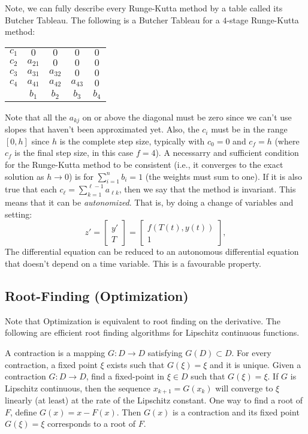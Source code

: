 \documentclass[12pt]{article}
\begin{document}
Note, we can fully describe every Runge-Kutta method by a table
called its Butcher Tableau.
The following is a Butcher Tableau for a $4$-stage Runge-Kutta method:
\begin{center}
\begin{tabular}{c|cccc}
$c_1$ & $0$ & $0$ & $0$ & $0$ \\
$c_2$ & $a_{21}$ & $0$ & $0$ & $0$ \\
$c_3$ & $a_{31}$ & $a_{32}$ & $0$ & $0$ \\
$c_4$ & $a_{41}$ & $a_{42}$ & $a_{43}$ & $0$ \\
\hline
 & $b_1$ & $b_2$ & $b_3$ & $b_4$
\end{tabular}
\end{center}
Note that all the $a_{kj}$ on or above the diagonal must be zero
since we can't use slopes that haven't been approximated yet.
Also, the $c_i$ must be in the range $[0,h]$ since $h$ is the complete
step size, typically with $c_0 = 0$ and $c_f = h$ (where $c_f$ is the final
step size, in this case $f=4$).
A necessarry and sufficient condition for the Runge-Kutta method to
be consistent (i.e., it converges to the exact solution as $h \rightarrow 0$)
is for $\sum_{i=1}^n b_i = 1$ (the weights must sum to one).
If it is also true that each $c_\ell = \sum_{k=1}^{\ell-1} a_{\ell k}$,
then we say that the method is invariant.
This means that it can be {\it autonomized}. That is, by doing a change
of variables and setting:
$$
z' = \left[\begin{array}{c}y'\\ T\end{array}\right] 
= \left[\begin{array}{c}f(T(t),y(t)) \\ 1\end{array}\right],
$$
The differential equation can be reduced to an autonomous differential
equation that doesn't depend on a time variable.
This is a favourable property.

\subsection*{Root-Finding (Optimization)}

Note that Optimization is equivalent to root finding on the derivative.
The following are efficient root finding algorithms for Lipschitz
continuous functions.

A contraction is a mapping $G : D \rightarrow D$ satisfying $G(D) \subset D$.
For every contraction, a fixed point $\xi$ exists such that $G(\xi) = \xi$
and it is unique.
Given a contraction $G : D \rightarrow D$, find a fixed-point in $\xi \in D$
such that $G(\xi) = \xi$.
If $G$ is Lipschitz continuous, then the sequence 
$x_{k+1} = G(x_k)$ will converge to $\xi$ linearly (at least)
at the rate of the Lipschitz constant.
One way to find a root of $F$, define $G(x) = x - F(x)$.
Then $G(x)$ is a contraction and its fixed point $G(\xi) = \xi$ corresponds to
a root of $F$.
\end{document}

